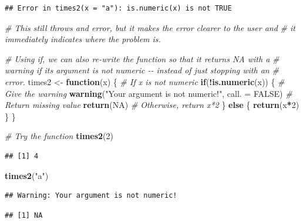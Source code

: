 \documentclass[
]{book}
\newenvironment{Shaded}{\begin{snugshade}}{\end{snugshade}}
\newcommand{\AttributeTok}[1]{\textcolor[rgb]{0.13,0.29,0.53}{#1}}
\newcommand{\CommentTok}[1]{\textcolor[rgb]{0.56,0.35,0.01}{\textit{#1}}}
\newcommand{\ConstantTok}[1]{\textcolor[rgb]{0.56,0.35,0.01}{#1}}
\newcommand{\ControlFlowTok}[1]{\textcolor[rgb]{0.13,0.29,0.53}{\textbf{#1}}}
\newcommand{\DecValTok}[1]{\textcolor[rgb]{0.00,0.00,0.81}{#1}}
\newcommand{\FunctionTok}[1]{\textcolor[rgb]{0.13,0.29,0.53}{\textbf{#1}}}
\newcommand{\NormalTok}[1]{#1}
\newcommand{\OtherTok}[1]{\textcolor[rgb]{0.56,0.35,0.01}{#1}}
\newcommand{\SpecialCharTok}[1]{\textcolor[rgb]{0.81,0.36,0.00}{\textbf{#1}}}
\newcommand{\StringTok}[1]{\textcolor[rgb]{0.31,0.60,0.02}{#1}}
\begin{document}
\begin{verbatim}
## Error in times2(x = "a"): is.numeric(x) is not TRUE
\end{verbatim}

\begin{Shaded}
\begin{Highlighting}[]
\CommentTok{\# This still throws and error, but it makes the error clearer to the user and }
\CommentTok{\# it immediately indicates where the problem is.}

\CommentTok{\# Using if, we can also re{-}write the function so that it returns NA with a}
\CommentTok{\# warning if its argument is not numeric {-}{-} instead of just stopping with an}
\CommentTok{\# error.}
\NormalTok{times2 }\OtherTok{\textless{}{-}} \ControlFlowTok{function}\NormalTok{(x) \{}
  \CommentTok{\# If x is not numeric}
  \ControlFlowTok{if}\NormalTok{(}\SpecialCharTok{!}\FunctionTok{is.numeric}\NormalTok{(x)) \{}
    \CommentTok{\# Give the warning}
    \FunctionTok{warning}\NormalTok{(}\StringTok{"Your argument is not numeric!"}\NormalTok{, }\AttributeTok{call. =} \ConstantTok{FALSE}\NormalTok{)}
    \CommentTok{\# Return missing value}
    \FunctionTok{return}\NormalTok{(}\ConstantTok{NA}\NormalTok{)}
    \CommentTok{\# Otherwise, return x*2}
\NormalTok{  \} }\ControlFlowTok{else}\NormalTok{ \{}
    \FunctionTok{return}\NormalTok{(x}\SpecialCharTok{*}\DecValTok{2}\NormalTok{)}
\NormalTok{  \}}
\NormalTok{\}}

\CommentTok{\# Try the function}
\FunctionTok{times2}\NormalTok{(}\DecValTok{2}\NormalTok{)}
\end{Highlighting}
\end{Shaded}

\begin{verbatim}
## [1] 4
\end{verbatim}

\begin{Shaded}
\begin{Highlighting}[]
\FunctionTok{times2}\NormalTok{(}\StringTok{"a"}\NormalTok{)}
\end{Highlighting}
\end{Shaded}

\begin{verbatim}
## Warning: Your argument is not numeric!
\end{verbatim}

\begin{verbatim}
## [1] NA
\end{verbatim}
\end{document}
